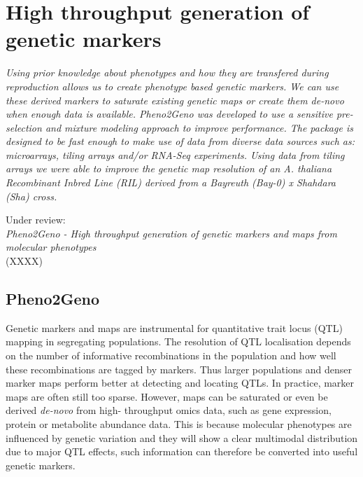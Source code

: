\chapter{High throughput generation of genetic markers}
\thispagestyle{empty}
\label{chap:pheno2geno}
\emph{Using prior knowledge about phenotypes and how they are transfered during 
reproduction allows us to create phenotype based genetic markers. We can use 
these derived markers to saturate existing genetic maps or create them de-novo 
when enough data is available. Pheno2Geno was developed to use a sensitive 
pre-selection and mixture modeling approach to improve performance. The package 
is designed to be fast enough to make use of data from diverse data sources such 
as: microarrays, tiling arrays and/or RNA-Seq experiments. Using data from tiling 
arrays we were able to improve the genetic map resolution of an A. thaliana 
Recombinant Inbred Line (RIL) derived from a Bayreuth (Bay-0) x Shahdara (Sha) cross.}

\null
\vfill

\begin{myexampleblock}{Under review:}
  \\
  \emph{Pheno2Geno - High throughput generation of genetic markers and maps from molecular phenotypes}\\
   (XXXX)
\end{myexampleblock}
\newpage

\section{Pheno2Geno}
Genetic markers and maps are instrumental for quantitative trait locus (QTL) mapping in segregating 
populations. The resolution of QTL localisation depends on the number of informative recombinations 
in the population and how well these recombinations are tagged by markers. Thus larger populations 
and denser marker maps perform better at detecting and locating QTLs. In practice, marker maps are 
often still too sparse. However, maps can be saturated or even be derived \emph{de-novo} from high-
throughput omics data, such as gene expression, protein or metabolite abundance data. This is because 
molecular phenotypes are influenced by genetic variation and they will show a clear multimodal 
distribution due to major QTL effects, such information can therefore be converted into useful 
genetic markers.

